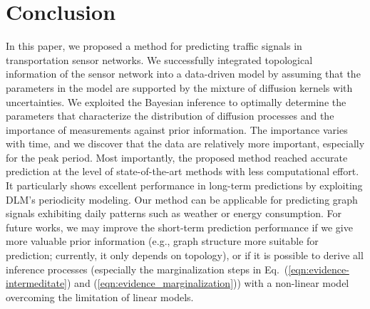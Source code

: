 \documentclass[journal]{IEEEtran}
\begin{document}
\section{Conclusion}
In this paper, we proposed a method for predicting traffic signals in transportation sensor networks. 
We successfully integrated topological information of the sensor network into a data-driven model by assuming that the parameters in the model are supported by the mixture of diffusion kernels with uncertainties.
We exploited the Bayesian inference to optimally determine the parameters that characterize the distribution of diffusion processes and the importance of measurements against prior information. 
The importance varies with time, and we discover that the data are relatively more important, especially for the peak period.
Most importantly, the proposed method reached accurate prediction at the level of state-of-the-art methods with less computational effort. 
It particularly shows excellent performance in long-term predictions by exploiting DLM's periodicity modeling.
Our method can be applicable for predicting graph signals exhibiting daily patterns such as weather or energy consumption.
For future works, we may improve the short-term prediction performance if we give more valuable prior information (e.g., graph structure more suitable for prediction; currently, it only depends on topology), or if it is possible to derive all inference processes (especially the marginalization steps in Eq.~(\ref{eqn:evidence-intermeditate}) and (\ref{eqn:evidence_marginalization})) with a non-linear model overcoming the limitation of linear models.

\printbibliography






\appendix
\end{document}
